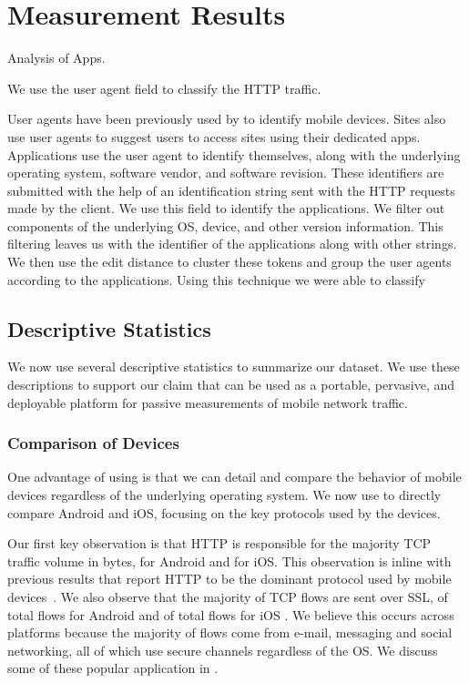 \section{Measurement Results}
\label{sec:measurements}

Analysis of Apps.

We use the user agent field to classify the HTTP traffic. 

User agents have been previously used by \tbd{} to identify mobile devices.
Sites also use user agents to suggest users to access sites using their dedicated apps.
Applications use the user agent to identify themselves, along with the underlying operating system, software vendor, and software revision.
These identifiers are submitted with the help of an identification string sent with the HTTP requests made by the client.
We use this field to identify the applications. 
We filter out components of the underlying OS, device, and other version information. 
This filtering leaves us with the identifier of the applications along with other strings. We then use the edit distance to cluster these tokens and group the user agents according to the applications. 
Using this technique we were able to classify   





\subsection{Descriptive Statistics}  

We now use several descriptive statistics to summarize our \moball dataset.
We use these descriptions to support our claim that \platname can be used as a portable, pervasive, and deployable platform for passive measurements of mobile network traffic. 

\subsubsection{Comparison of Devices} 
One advantage of using \platname is that we can detail and compare the behavior of mobile devices regardless of the underlying operating system. 
We now use  to directly compare Android and iOS, focusing on the key protocols used by the devices. 

Our first key observation is that HTTP is responsible for the majority TCP traffic volume in bytes,  for Android and  for iOS. 
This observation is inline with previous results that report HTTP to be the dominant protocol used by mobile devices~\cite{falaki:mobileusage, maier:mobtraffic}. 
We also observe that the majority of TCP flows are sent over SSL,   of total flows for Android and  of total flows for iOS . 
We believe this occurs across platforms because the majority of flows come from e-mail, messaging and social networking, all of which use secure channels regardless of the OS. 
We discuss some of these popular application in .

